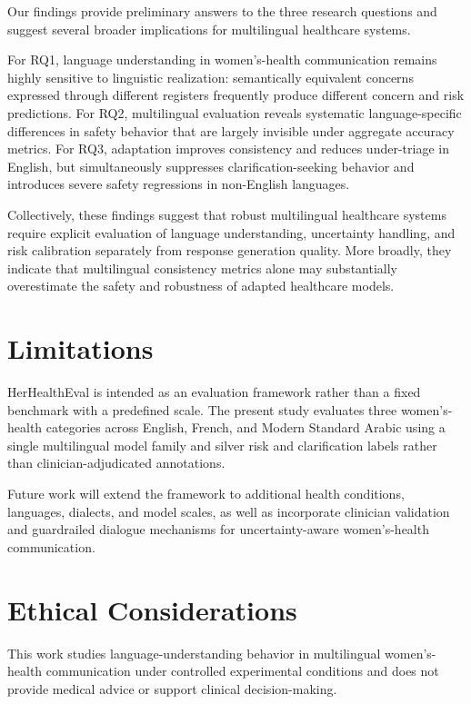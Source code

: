 Our findings provide preliminary answers to the three research questions and suggest several broader implications for multilingual healthcare systems.

For RQ1, language understanding in women's-health communication remains highly sensitive to linguistic realization: semantically equivalent concerns expressed through different registers frequently produce different concern and risk predictions. For RQ2, multilingual evaluation reveals systematic language-specific differences in safety behavior that are largely invisible under aggregate accuracy metrics. For RQ3, adaptation improves consistency and reduces under-triage in English, but simultaneously suppresses clarification-seeking behavior and introduces severe safety regressions in non-English languages.

Collectively, these findings suggest that robust multilingual healthcare systems require explicit evaluation of language understanding, uncertainty handling, and risk calibration separately from response generation quality. More broadly, they indicate that multilingual consistency metrics alone may substantially overestimate the safety and robustness of adapted healthcare models.

\section*{Limitations}
\label{sec:limitations}

HerHealthEval is intended as an evaluation framework rather than a fixed benchmark with a predefined scale. The present study evaluates three women's-health categories across English, French, and Modern Standard Arabic using a single multilingual model family and silver risk and clarification labels rather than clinician-adjudicated annotations.

Future work will extend the framework to additional health conditions, languages, dialects, and model scales, as well as incorporate clinician validation and guardrailed dialogue mechanisms for uncertainty-aware women's-health communication.


\section*{Ethical Considerations}
\label{sec:ethics}

This work studies language-understanding behavior in multilingual women's-health communication under controlled experimental conditions and does not provide medical advice or support clinical decision-making.


